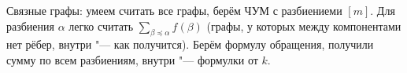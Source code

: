 Связные графы: умеем считать все графы, берём ЧУМ с разбиениеми $[m]$.
Для разбиения $\alpha$ легко считать $\sum_{\beta \preccurlyeq \alpha} f(\beta)$ (графы, у которых между компонентами
нет рёбер, внутри "--- как получится).
Берём формулу обращения, получили сумму по всем разбиениям, внутри "--- формулки от $k$.

\section{} %
\TODO

\section{} %
\TODO
